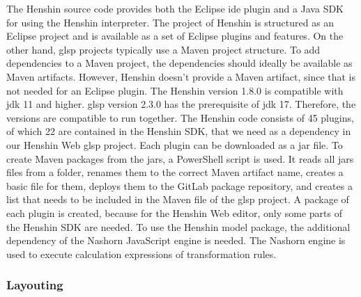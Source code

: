   The Henshin source code provides both the Eclipse \ac{ide} plugin and a Java SDK for using the Henshin interpreter. The project of Henshin is structured as an Eclipse project and is available as a set of Eclipse plugins and features. \cite{henshin-repo} On the other hand, \ac{glsp} projects typically use a Maven project structure. \cite{glsp-repo} To add dependencies to a Maven project, the dependencies should ideally be available as Maven artifacts. However, Henshin doesn't provide a Maven artifact, since that is not needed for an Eclipse plugin. The Henshin version 1.8.0 is compatible with \acs{jdk} 11 and higher. \ac{glsp} version 2.3.0 has the prerequisite of \acs{jdk} 17. Therefore, the versions are compatible to run together. The Henshin code consists of 45 plugins, of which 22 are contained in the Henshin SDK, that we need as a dependency in our Henshin Web \ac{glsp} project. Each plugin can be downloaded as a \acs{jar} file. To create Maven packages from the \acsp{jar}, a PowerShell script is used. It reads all \acsp{jar} files from a folder, renames them to the correct Maven artifact name, creates a basic  file for them, deploys them to the GitLab package repository, and creates a list that needs to be included in the Maven  file of the \ac{glsp} project. A package of each plugin is created, because for the Henshin Web editor, only some parts of the Henshin SDK are needed. To use the Henshin model package, the additional dependency of the Nashorn JavaScript engine \cite{nashorn-repo} is needed. The Nashorn engine is used to execute calculation expressions of transformation rules. \cite{henshin}

  \subsubsection{Layouting}
  \label{subsec:layouting}

